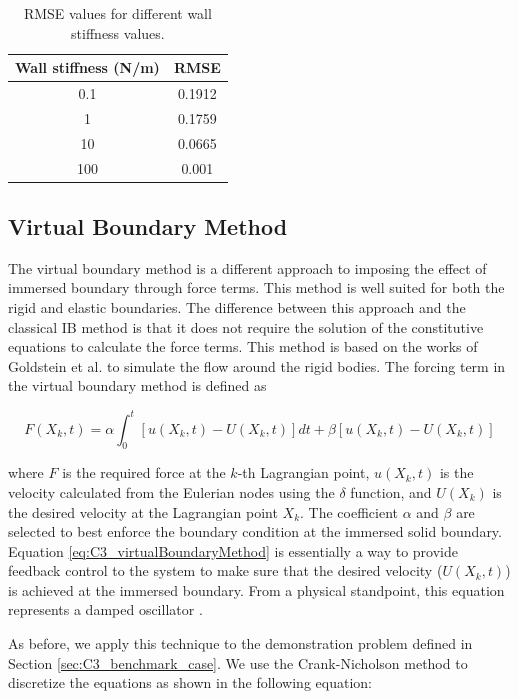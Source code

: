\begin{table}[H]
\centering
\begin{tabular}{c | c}
     Wall stiffness (N/m) & RMSE \\ \hline \hline
     0.1 & 0.1912 \\ \hline
     1 & 0.1759  \\ \hline
     10 & 0.0665 \\ \hline
     100 & 0.001 \\
\end{tabular}
\caption{RMSE values for different wall stiffness values.}
\label{table:C3_classicalIBResultWallStiffnessRMSE}
\end{table}

\subsection{Virtual Boundary Method}
The virtual boundary method is a different approach to imposing the effect of immersed boundary through force terms. This method is well suited for both the rigid and elastic boundaries. The difference between this approach and the classical IB method is that it does not require the solution of the constitutive equations to calculate the force terms. This method is based on the works of Goldstein et al. \cite{goldstein1993modeling} to simulate the flow around the rigid bodies. The forcing term in the virtual boundary method is defined as

\begin{equation}\label{eq:C3_virtualBoundaryMethod}
    F(X_k, t) = 
    \alpha \int_0^t \left[ u(X_k, t) - U(X_k, t) \right] dt + 
    \beta \left[ u(X_k, t) - U(X_k, t) \right]
\end{equation}

where $F$ is the required force at the $k$-th Lagrangian point, $u(X_k, t)$ is the velocity calculated from the Eulerian nodes using the $\delta$ function, and $U(X_k)$ is the desired velocity at the Lagrangian point $X_k$. The coefficient $\alpha$ and $\beta$ are selected to best enforce the boundary condition at the immersed solid boundary. Equation \eqref{eq:C3_virtualBoundaryMethod} is essentially a way to provide feedback control to the system to make sure that the desired velocity ($U(X_k, t)$) is achieved at the immersed boundary. From a physical standpoint, this equation represents a damped oscillator \cite{iaccarino2003immersed}.

As before, we apply this technique to the demonstration problem defined in Section \ref{sec:C3_benchmark_case}. We use the Crank-Nicholson method to discretize the equations as shown in the following equation:


